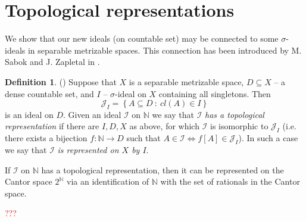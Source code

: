\documentclass{amsart}
\theoremstyle{definition}
\newtheorem{df}{Definition}
\theoremstyle{definition}
\newcommand{\N}{{\mathbb N}}
\newcommand{\I}{\mathcal I}
\begin{document}
    \color{black}


\section{Topological representations}

We show that our new ideals (on countable set) may be connected to some $\sigma$-ideals in separable metrizable spaces. This connection has been introduced by M. Sabok and J. Zapletal in \cite{Sabok}. 

\begin{df} (\cite{Sabok})
Suppose that $X$ is a separable metrizable space, $D\subseteq X$ -- a dense countable set, and $I$ -- $\sigma$-ideal on $X$ containing all singletons. Then
$$\mathcal{J}_I=\left\{A\subseteq D\ :\ cl(A)\in I\right\}$$
is an ideal on $D$. Given an ideal $\mathcal{I}$ on $\N$ we say that $\mathcal{I}$ \emph{has a topological representation} if there are $I,D,X$ as above, for which $\mathcal{I}$ is isomorphic to $\mathcal{J}_I$ (i.e. there exists a bijection $f\colon \N\to D$ such that $A\in\I \Leftrightarrow f[A]\in\mathcal{J}_I$). In such a case we say that $\mathcal{I}$ \emph{is represented on $X$ by $I$}.
\end{df}


If $\mathcal{I}$ on $\N$ has a topological representation, then it can be represented on the Cantor space $2^\N$ via an identification of $\N$ with the set of rationals in the Cantor space. 

\textcolor{red}{???}
\end{document}
